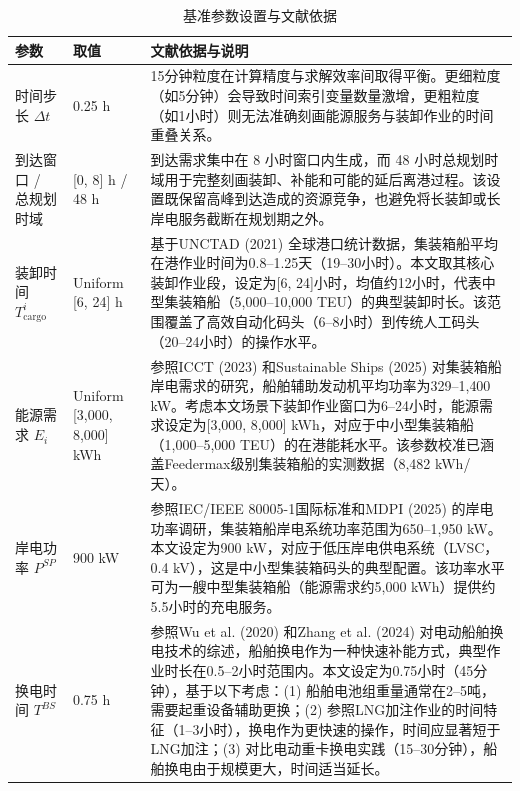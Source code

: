 \documentclass[UTF8, a4paper, 12pt]{ctexart}
\begin{document}
\begin{table}[htbp]
    \centering
    \caption{基准参数设置与文献依据}
    \label{tab:exp_params}
    \tiny
    \renewcommand{\arraystretch}{1.3}
    \begin{threeparttable}
    \begin{tabular}{p{3.2cm} p{2cm} p{9cm}}
        \toprule
        \textbf{参数} & \textbf{取值} & \textbf{文献依据与说明} \\
        \midrule
        时间步长 $\Delta t$ & 0.25 h & 15分钟粒度在计算精度与求解效率间取得平衡。更细粒度（如5分钟）会导致时间索引变量数量激增，更粗粒度（如1小时）则无法准确刻画能源服务与装卸作业的时间重叠关系。 \\
        \addlinespace
        到达窗口 / 总规划时域 & [0, 8] h / 48 h & 到达需求集中在 8 小时窗口内生成，而 48 小时总规划时域用于完整刻画装卸、补能和可能的延后离港过程。该设置既保留高峰到达造成的资源竞争，也避免将长装卸或长岸电服务截断在规划期之外。 \\
        \addlinespace
        装卸时间 $T_{\text{cargo}}^i$ & Uniform [6, 24] h & 基于UNCTAD (2021) \cite{UNCTAD2021}全球港口统计数据，集装箱船平均在港作业时间为0.8--1.25天（19--30小时）。本文取其核心装卸作业段，设定为[6, 24]小时，均值约12小时，代表中型集装箱船（5,000--10,000 TEU）的典型装卸时长。该范围覆盖了高效自动化码头（6--8小时）到传统人工码头（20--24小时）的操作水平。 \\
        \addlinespace
        能源需求 $E_i$ & Uniform [3,000, 8,000] kWh & 参照ICCT (2023) \cite{ICCT2023}和Sustainable Ships (2025) \cite{SustainableShips2025}对集装箱船岸电需求的研究，船舶辅助发动机平均功率为329--1,400 kW。考虑本文场景下装卸作业窗口为6--24小时，能源需求设定为[3,000, 8,000] kWh，对应于中小型集装箱船（1,000--5,000 TEU）的在港能耗水平。该参数校准已涵盖Feedermax级别集装箱船的实测数据（8,482 kWh/天）。 \\
        \addlinespace
        岸电功率 $P^{SP}$ & 900 kW & 参照IEC/IEEE 80005-1国际标准\cite{IEC80005}和MDPI (2025) \cite{MDPI2025}的岸电功率调研，集装箱船岸电系统功率范围为650--1,950 kW。本文设定为900 kW，对应于低压岸电供电系统（LVSC，0.4 kV），这是中小型集装箱码头的典型配置。该功率水平可为一艘中型集装箱船（能源需求约5,000 kWh）提供约5.5小时的充电服务。 \\
        \addlinespace
        换电时间 $T^{BS}$ & 0.75 h & 参照Wu et al. (2020) \cite{Zhang2022_EShip}和Zhang et al. (2024) \cite{Zhang2024_Voyage}对电动船舶换电技术的综述，船舶换电作为一种快速补能方式，典型作业时长在0.5--2小时范围内。本文设定为0.75小时（45分钟），基于以下考虑：(1) 船舶电池组重量通常在2--5吨，需要起重设备辅助更换；(2) 参照LNG加注作业的时间特征（1--3小时）\cite{Fan2021}，换电作为更快速的操作，时间应显著短于LNG加注；(3) 对比电动重卡换电实践（15--30分钟），船舶换电由于规模更大，时间适当延长。 \\

\end{tabular}
\end{threeparttable}
\end{table}
\end{document}
